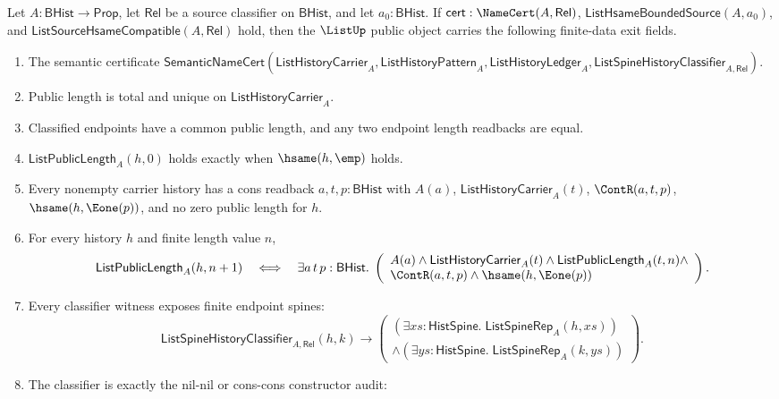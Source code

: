 \begin{theorem}
\label{thm:list-hsame-compatible-bounded-source-finite-data-exit-package}
Let $A:\mathsf{BHist}\to\mathsf{Prop}$, let $\mathsf{Rel}$ be a source
classifier on $\mathsf{BHist}$, and let $a_0:\mathsf{BHist}$. If
$\mathsf{cert}:\NameCert(A,\mathsf{Rel})$,
$\mathsf{ListHsameBoundedSource}(A,a_0)$, and
$\mathsf{ListSourceHsameCompatible}(A,\mathsf{Rel})$ hold, then the
$\ListUp$ public object carries the following finite-data exit fields.
\begin{enumerate}
  \item
  The semantic certificate
  $\mathsf{SemanticNameCert}(\mathsf{ListHistoryCarrier}_A,
  \mathsf{ListHistoryPattern}_A,\mathsf{ListHistoryLedger}_A,
  \mathsf{ListSpineHistoryClassifier}_{A,\mathsf{Rel}})$.
  \item
  Public length is total and unique on $\mathsf{ListHistoryCarrier}_A$.
  \item
  Classified endpoints have a common public length, and any two endpoint
  length readbacks are equal.
  \item
  $\mathsf{ListPublicLength}_A(h,0)$ holds exactly when
  $\hsame(h,\emp)$ holds.
  \item
  Every nonempty carrier history has a cons readback
  $a,t,p:\mathsf{BHist}$ with $A(a)$,
  $\mathsf{ListHistoryCarrier}_A(t)$, $\ContR(a,t,p)$,
  $\hsame(h,\Eone(p))$, and no zero public length for $h$.
  \item
  For every history $h$ and finite length value $n$,
  $$
  \mathsf{ListPublicLength}_A(h,n+1)
  \quad\Longleftrightarrow\quad
  \exists a\,t\,p:\mathsf{BHist}.\;
  \left(
  \begin{array}{l}
  A(a)\land \mathsf{ListHistoryCarrier}_A(t)\land
  \mathsf{ListPublicLength}_A(t,n)\land\\
  \ContR(a,t,p)\land \hsame(h,\Eone(p))
  \end{array}
  \right).
  $$
  \item
  Every classifier witness exposes finite endpoint spines:
  $$
  \mathsf{ListSpineHistoryClassifier}_{A,\mathsf{Rel}}(h,k)
  \to
  \left(
  \begin{array}{l}
  (\exists xs:\mathsf{HistSpine}.\;\mathsf{ListSpineRep}_A(h,xs))\\
  \land
  (\exists ys:\mathsf{HistSpine}.\;\mathsf{ListSpineRep}_A(k,ys))
  \end{array}
  \right).
  $$
  \item
  The classifier is exactly the nil-nil or cons-cons constructor audit:

\end{enumerate}
\end{theorem}
